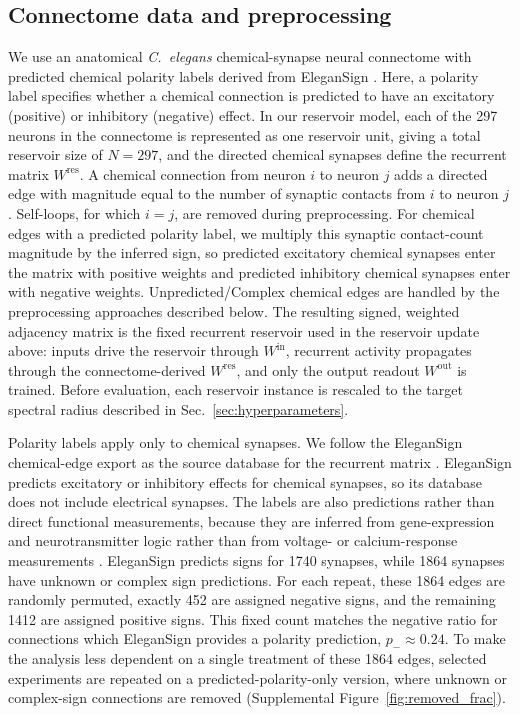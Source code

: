 \documentclass[a4paper,fleqn]{style_neural_networks/cas-dc}
\let\parencite\citep
\begin{document}
\subsection{Connectome data and preprocessing}
\label{sec:connectome_dataset}
We use an anatomical \textit{C.\ elegans} chemical-synapse neural connectome with predicted chemical polarity labels derived from EleganSign \parencite{fenyves_szilágyi_zsolt_vassy_csaba_2020}. Here, a polarity label specifies whether a chemical connection is predicted to have an excitatory (positive) or inhibitory (negative) effect. In our reservoir model, each of the 297 neurons in the connectome is represented as one reservoir unit, giving a total reservoir size of \(N=297\), and the directed chemical synapses define the recurrent matrix \(W^{\mathrm{res}}\). A chemical connection from neuron \(i\) to neuron \(j\) adds a directed edge with magnitude equal to the number of synaptic contacts from \(i\) to neuron \(j\) \parencite{Varshney2011,Cook2019,Casal2020,churchland_garcia-ojalvo_2026}. Self-loops, for which \(i=j\), are removed during preprocessing. For chemical edges with a predicted polarity label, we multiply this synaptic contact-count magnitude by the inferred sign, so predicted excitatory chemical synapses enter the matrix with positive weights and predicted inhibitory chemical synapses enter with negative weights. Unpredicted/Complex chemical edges are handled by the preprocessing approaches described below. The resulting signed, weighted adjacency matrix is the fixed recurrent reservoir used in the reservoir update above: inputs drive the reservoir through \(W^{\mathrm{in}}\), recurrent activity propagates through the connectome-derived \(W^{\mathrm{res}}\), and only the output readout \(W^{\mathrm{out}}\) is trained. Before evaluation, each reservoir instance is rescaled to the target spectral radius described in Sec.~\ref{sec:hyperparameters}.

Polarity labels apply only to chemical synapses. We follow the EleganSign chemical-edge export as the source database for the recurrent matrix \parencite{fenyves_szilágyi_zsolt_vassy_csaba_2020}. EleganSign predicts excitatory or inhibitory effects for chemical synapses, so its database does not include electrical synapses. The labels are also predictions rather than direct functional measurements, because they are inferred from gene-expression and neurotransmitter logic rather than from voltage- or calcium-response measurements \parencite{fenyves_szilágyi_zsolt_vassy_csaba_2020}. EleganSign predicts signs for 1740 synapses, while 1864 synapses have unknown or complex sign predictions.  For each repeat, these 1864 edges are randomly permuted, exactly 452 are assigned negative signs, and the remaining 1412 are assigned positive signs. This fixed count matches the negative ratio for connections which EleganSign provides a polarity prediction, \(p_-\approx0.24\). To make the analysis less dependent on a single treatment of these 1864 edges, selected experiments are repeated on a predicted-polarity-only version, where unknown or complex-sign connections are removed (Supplemental Figure~\ref{fig:removed_frac}).
\end{document}

